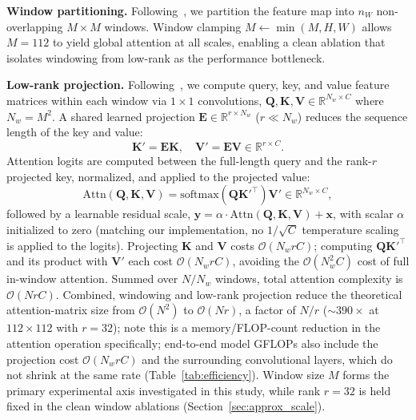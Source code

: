 \textbf{Window partitioning.} Following~\cite{liu2021swin}, we partition the feature map into $n_W$ non-overlapping $M{\times}M$ windows. Window clamping $M \leftarrow \min(M, H, W)$ allows $M{=}112$ to yield global attention at all scales, enabling a clean ablation that isolates windowing from low-rank as the performance bottleneck.

\textbf{Low-rank projection.} Following~\cite{wang2020linformer}, we compute query, key, and value feature matrices within each window via $1{\times}1$ convolutions, $\mathbf{Q}, \mathbf{K}, \mathbf{V} \in \mathbb{R}^{N_w \times C}$ where $N_w{=}M^2$. A shared learned projection $\mathbf{E} \in \mathbb{R}^{r \times N_w}$ ($r \ll N_w$) reduces the sequence length of the key and value:
\begin{equation}
  \mathbf{K}' = \mathbf{E}\mathbf{K}, \quad \mathbf{V}' = \mathbf{E}\mathbf{V} \in \mathbb{R}^{r \times C}.
  \label{eq:lowrank}
\end{equation}
Attention logits are computed between the full-length query and the rank-$r$ projected key, normalized, and applied to the projected value:
\begin{equation}
  \mathrm{Attn}(\mathbf{Q},\mathbf{K},\mathbf{V}) = \mathrm{softmax}\!\left(\mathbf{Q}\mathbf{K}'^\top\right)\mathbf{V}' \in \mathbb{R}^{N_w \times C},
  \label{eq:lowrank_attn}
\end{equation}
followed by a learnable residual scale, $\mathbf{y} = \alpha \cdot \mathrm{Attn}(\mathbf{Q},\mathbf{K},\mathbf{V}) + \mathbf{x}$, with scalar $\alpha$ initialized to zero (matching our implementation, no $1/\sqrt{C}$ temperature scaling is applied to the logits). Projecting $\mathbf{K}$ and $\mathbf{V}$ costs $\mathcal{O}(N_w r C)$; computing $\mathbf{Q}\mathbf{K}'^\top$ and its product with $\mathbf{V}'$ each cost $\mathcal{O}(N_w r C)$, avoiding the $\mathcal{O}(N_w^2 C)$ cost of full in-window attention. Summed over $N/N_w$ windows, total attention complexity is $\mathcal{O}(NrC)$. Combined, windowing and low-rank projection reduce the theoretical attention-matrix size from $\mathcal{O}(N^2)$ to $\mathcal{O}(Nr)$, a factor of $N/r$ (${\sim}390{\times}$ at $112{\times}112$ with $r{=}32$); note this is a memory/FLOP-count reduction in the attention operation specifically; end-to-end model GFLOPs also include the projection cost $\mathcal{O}(N_wrC)$ and the surrounding convolutional layers, which do not shrink at the same rate (Table~\ref{tab:efficiency}). Window size $M$ forms the primary experimental axis investigated in this study, while rank $r{=}32$ is held fixed in the clean window ablations (Section~\ref{sec:approx_scale}).

